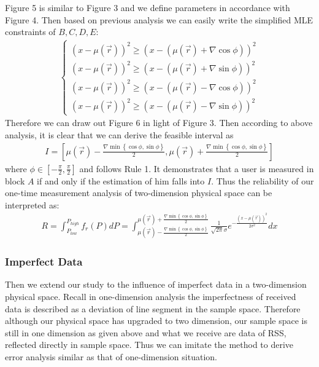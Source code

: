 \documentclass[journal]{IEEEtran}
\begin{document}
Figure 5 is similar to Figure 3 and we define parameters in accordance with Figure 4. Then based on previous analysis we can easily write the simplified MLE constraints of $B, C, D, E$:
\begin{align}
\left\{\begin{array}{l}
{(x - \mu (\vec r))^2} \ge {(x - (\mu (\vec r) + \nabla \cos \phi ))^2}\\
{(x - \mu (\vec r))^2} \ge {(x - (\mu (\vec r) + \nabla \sin \phi ))^2}\\
{(x - \mu (\vec r))^2} \ge {(x - (\mu (\vec r) - \nabla \cos \phi ))^2}\\
{(x - \mu (\vec r))^2} \ge {(x - (\mu (\vec r) - \nabla \sin \phi ))^2}
\end{array}\right.
\end{align}
Therefore we can draw out Figure 6 in light of Figure 3. Then according to above analysis, it is clear that we can derive the feasible interval as
\begin{align}
I = \left[ {\mu (\vec r) - \frac{{\nabla \min \left\{ {\cos \phi ,\sin \phi } \right\}}}{2},\mu (\vec r) + \frac{{\nabla \min \left\{ {\cos \phi ,\sin \phi } \right\}}}{2}} \right]
\end{align}
where $\phi  \in \left[ { - \frac{\pi }{2},\frac{\pi }{2}} \right]$ and follows Rule 1. It demonstrates that a user is measured in block $A$ if and only if the estimation of him falls into $I$. Thus the reliability of our one-time measurement analysis of two-dimension physical space can be interpreted as:
\begin{align}
R = \int_{{P_{low}}}^{{P_{high}}} {{f_r}(P)dP = } \int_{\mu (\vec r) - \frac{{\nabla \min \left\{ {\cos \phi ,\sin \phi } \right\}}}{2}}^{\mu (\vec r) + \frac{{\nabla \min \left\{ {\cos \phi ,\sin \phi } \right\}}}{2}} {\frac{1}{{\sqrt {2\pi } \sigma }}{e^{ - \frac{{{{(x - \mu (\vec r))}^2}}}{{2{\sigma ^2}}}}}dx}
\end{align}

\subsubsection{Imperfect Data}
Then we extend our study to the influence of imperfect data in a two-dimension physical space. Recall in one-dimension analysis the imperfectness of received data is described as a deviation of line segment in the sample space. Therefore although our physical space has upgraded to two dimension, our sample space is still in one dimension as given above and what we receive are data of RSS, reflected directly in sample space. Thus we can imitate the method to derive error analysis similar as that of one-dimension situation.
\end{document}
